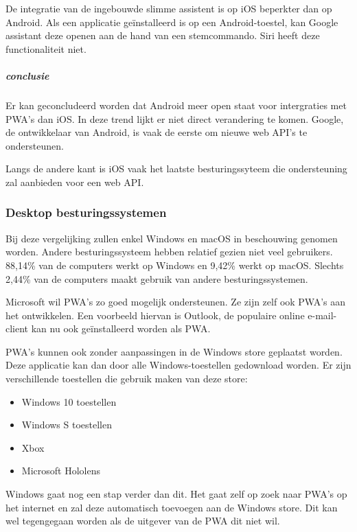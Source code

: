	
		De integratie van de ingebouwde slimme assistent is op iOS beperkter dan op Android. Als een applicatie geïnstalleerd is op een Android-toestel, kan Google assistant deze openen aan de hand van een stemcommando. Siri heeft deze functionaliteit niet.
		\autocite{Lathiya2020}
		
		\subparagraph{conclusie}
		
			Er kan geconcludeerd worden dat Android meer open staat voor intergraties met PWA's dan iOS. In deze trend lijkt er niet direct verandering te komen. Google, de ontwikkelaar van Android, is vaak de eerste om nieuwe web API's te ondersteunen.
			
			Langs de andere kant is iOS vaak het laatste besturingssyteem die ondersteuning zal aanbieden voor een web API.
	
	
	\subsubsection{Desktop besturingssystemen}
		Bij deze vergelijking zullen enkel Windows en macOS in beschouwing genomen worden. Andere besturingssysteem hebben relatief gezien niet veel gebruikers. 88,14\% van de computers werkt op Windows en 9,42\% werkt op macOS. Slechts 2,44\% van de computers maakt gebruik van andere besturingssystemen.
		\autocite{netMarketShare2020}
		
		Microsoft wil PWA's zo goed mogelijk ondersteunen. Ze zijn zelf ook PWA's aan het ontwikkelen. Een voorbeeld hiervan is Outlook, de populaire online e-mail-client kan nu ook geïnstalleerd worden als PWA.
		\autocite{Microsoft2020a}
		
		PWA's kunnen ook zonder aanpassingen in de Windows store geplaatst worden. Deze applicatie kan dan door alle Windows-toestellen gedownload worden. Er zijn verschillende toestellen die gebruik maken van deze store:
		\begin{itemize}
			\item	Windows 10 toestellen
			\item	Windows S toestellen
			\item	Xbox
			\item	Microsoft Hololens 
		\end{itemize}
		
		Windows gaat nog een stap verder dan dit. Het gaat zelf op zoek naar PWA's op het internet en zal deze automatisch toevoegen aan de Windows store. Dit kan wel tegengegaan worden als de uitgever van de PWA dit niet wil.
		\autocite{Gustafson2017} \autocite{Gustafson2017a}
		
